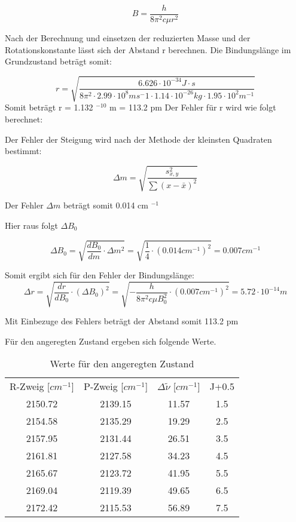 \documentclass[12pt]{article}
\begin{document}
  \begin{equation}
      B =\frac{\si{h}}{8\pi^2c\mu r^2}
  \end{equation}
  
  Nach der Berechnung und einsetzen der reduzierten Masse und der Rotationskonstante lässt sich der Abstand r berechnen. Die Bindungslänge im Grundzustand beträgt somit:
  
  \begin{equation}
      r = \sqrt {\frac{6.626\cdot 10^{-34} J\cdot s}{8\pi^2\cdot 2.99 \cdot 10^8 ms^-1 \cdot  1.14\cdot 10^{-26}kg\cdot 1.95\cdot 10^2m^{-1}}}
  \end{equation}
  Somit beträgt r = 1.132 $^{-10}$ m = 113.2 pm
  Der Fehler für r wird wie folgt berechnet:
  
  Der Fehler der Steigung wird nach der Methode der kleinsten Quadraten bestimmt:
  
  \begin{equation}
      \Delta m = \sqrt{\frac{s^2_{x,y}}{\sum (x-\bar{x})^2}}
  \end{equation}
  
  Der Fehler $\Delta m$ beträgt somit 0.014 cm $^{-1}$
  
  Hier raus folgt $\Delta B_0$ 
  
  \begin{equation}
      \Delta B_0 = \sqrt{\frac{dB_0}{dm}\cdot \Delta m^2} = \sqrt{\frac{1}{4}\cdot (0.014 cm^{-1})^2} = 0.007 cm^{-1}
  \end{equation}
  
  Somit ergibt sich für den Fehler der Bindungslänge:
  \begin{equation}
      \Delta r = \sqrt{\frac{dr}{dB_0} \cdot (\Delta B_0)^2} =  \sqrt{-\frac{h}{8\pi^2c\mu B_0^2}\cdot (0.007 cm^{-1})^2} = 5.72 \cdot 10^{-14} m 
  \end{equation}
  
  Mit Einbezuge des Fehlers beträgt der Abstand somit 113.2  pm
  
  Für den angeregten Zustand ergeben sich folgende Werte.
  
  \begin{table}[htpb]
  \centering
  \caption{Werte für den angeregten Zustand}
  \begin{tabular}{cccc}
    R-Zweig [$cm^{-1}$] & P-Zweig [$cm^{-1}$] & $\Delta \tilde {\nu}$ [$cm^{-1}$] & J+0.5\\
2150.72 & 2139.15 &  11.57 & 1.5\\
2154.58 & 2135.29 &  19.29 & 2.5\\
2157.95 & 2131.44 &  26.51 & 3.5\\
2161.81 & 2127.58 &  34.23 & 4.5\\
2165.67 & 2123.72 &  41.95 & 5.5\\
2169.04 & 2119.39 &  49.65 & 6.5\\
2172.42 & 2115.53 &  56.89 & 7.5\\
  
  \end{tabular}

\end{table}
 
\end{document}
